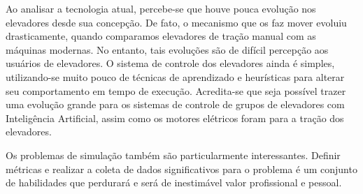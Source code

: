 Ao analisar a tecnologia atual, percebe-se que houve pouca evolução nos elevadores desde sua concepção. De fato, o mecanismo que os faz mover evoluiu drasticamente, quando comparamos elevadores de tração manual com as máquinas modernas. No entanto, tais evoluções são de difícil percepção aos usuários de elevadores. O sistema de controle dos elevadores ainda é simples, utilizando-se muito pouco de técnicas de aprendizado e heurísticas para alterar seu comportamento em tempo de execução. Acredita-se que seja possível trazer uma evolução grande para os sistemas de controle de grupos de elevadores com Inteligência Artificial, assim como os motores elétricos foram para a tração dos elevadores.

Os problemas de simulação também são particularmente interessantes. Definir métricas e realizar a coleta de dados significativos para o problema é um conjunto de habilidades que perdurará e será de inestimável valor profissional e pessoal.